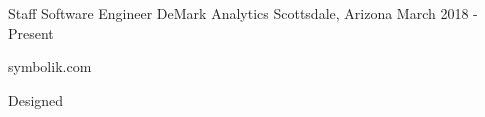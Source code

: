 

\begin{cventries}

  \cventry
    {Staff Software Engineer} %
    {DeMark Analytics} %
    {Scottsdale, Arizona} %
    {March 2018 - Present} %
    {
      \begin{cvitems} %
        \item {symbolik.com}
        \item {Designed}
      \end{cvitems}
    }

\end{cventries}
